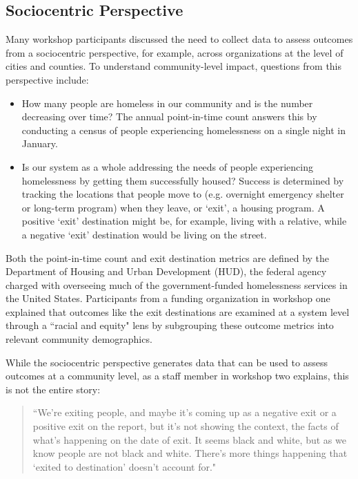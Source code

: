 \subsection{Sociocentric Perspective}
Many workshop participants discussed the need to collect data to assess outcomes from a sociocentric perspective, for example, across organizations at the level of cities and counties. To understand community-level impact, questions from this perspective include:

\begin{itemize}
\item How many people are homeless in our community and is the number decreasing over time? The annual point-in-time count answers this by conducting a census of people experiencing homelessness on a single night in January.
\item Is our system as a whole addressing the needs of people experiencing homelessness by getting them successfully housed? Success is determined by tracking the locations that people move to (e.g. overnight emergency shelter or long-term program) when they leave, or `exit', a housing program. A positive `exit' destination might be, for example, living with a relative, while a negative `exit' destination would be living on the street.
\end{itemize}

Both the point-in-time count and exit destination metrics are defined by the Department of Housing and Urban Development (HUD), the federal agency charged with overseeing much of the government-funded homelessness services in the United States. Participants from a funding organization in workshop one explained that outcomes like the exit destinations are examined at a system level through a ``racial and equity" lens by subgrouping these outcome metrics into relevant community demographics.

While the sociocentric perspective generates data that can be used to assess outcomes at a community level, as a staff member in workshop two explains, this is not the entire story:

\begin{quote}\singlespacing ``We're exiting people, and maybe it's coming up as a negative exit or a positive exit on the report, but it's not showing the context, the facts of what's happening on the date of exit. It seems black and white, but as we know people are not black and white. There's more things happening that `exited to destination' doesn't account for." \end{quote}

